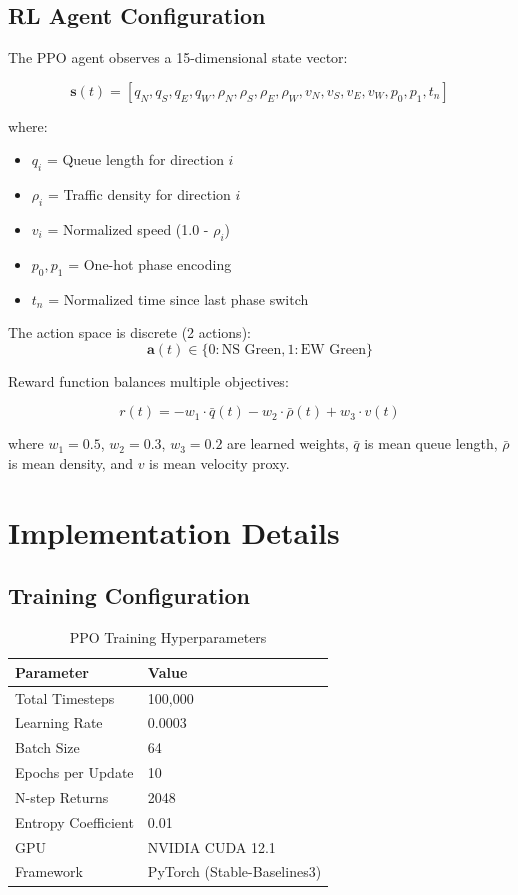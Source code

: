 \documentclass[10pt,conference]{IEEEtran}
\begin{document}
\subsection{RL Agent Configuration}

The PPO agent observes a 15-dimensional state vector:

\begin{equation}
\mathbf{s}(t) = [q_N, q_S, q_E, q_W, \rho_N, \rho_S, \rho_E, \rho_W, v_N, v_S, v_E, v_W, p_0, p_1, t_n]
\end{equation}

where:
\begin{itemize}
    \item $q_i$ = Queue length for direction $i$
    \item $\rho_i$ = Traffic density for direction $i$
    \item $v_i$ = Normalized speed (1.0 - $\rho_i$)
    \item $p_0, p_1$ = One-hot phase encoding
    \item $t_n$ = Normalized time since last phase switch
\end{itemize}

The action space is discrete (2 actions):
\begin{equation}
\mathbf{a}(t) \in \{0: \text{NS Green}, 1: \text{EW Green}\}
\end{equation}

Reward function balances multiple objectives:

\begin{equation}
r(t) = -w_1 \cdot \bar{q}(t) - w_2 \cdot \bar{\rho}(t) + w_3 \cdot v(t)
\end{equation}

where $w_1=0.5$, $w_2=0.3$, $w_3=0.2$ are learned weights, $\bar{q}$ is mean queue length, $\bar{\rho}$ is mean density, and $v$ is mean velocity proxy.

\section{Implementation Details}

\subsection{Training Configuration}

\begin{table}[h]
\centering
\caption{PPO Training Hyperparameters}
\begin{tabular}{ll}
\hline
\textbf{Parameter} & \textbf{Value} \\
\hline
Total Timesteps & 100,000 \\
Learning Rate & 0.0003 \\
Batch Size & 64 \\
Epochs per Update & 10 \\
N-step Returns & 2048 \\
Entropy Coefficient & 0.01 \\
GPU & NVIDIA CUDA 12.1 \\
Framework & PyTorch (Stable-Baselines3) \\
\hline
\end{tabular}
\end{table}
\end{document}
